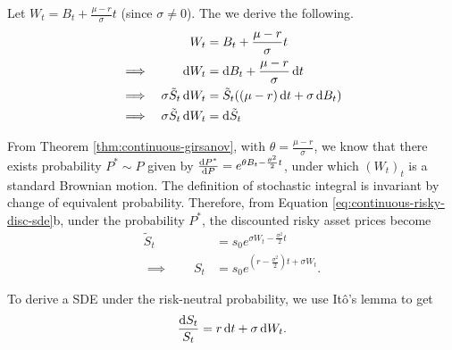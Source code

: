 Let $ W_t = B_t + \frac{\mu - r}{\sigma} t $ (since $ \sigma \ne 0 $). The we derive the following.
\begin{subequations}
	\label{eq:continuous-risky-disc-sde}
	\begin{align}
		&&  W_t  &=  B_t + \frac{\mu - r}{\sigma} t  \\
		\implies  &&  \dif W_t  &=  \dif B_t + \frac{\mu - r}{\sigma} \dif t  \nonumber \\
		\implies  &&  \sigma \tilde{S}_t \dif W_t  &=  \tilde{S}_t ( (\mu - r) \dif t + \sigma \dif B_t )  \nonumber \\
		\implies  &&  \sigma \tilde{S}_t \dif W_t  &=  \dif \tilde{S}_t
	\end{align}
\end{subequations}

From Theorem \ref{thm:continuous-girsanov}, with $ \theta = \frac{\mu - r}{\sigma} $, we know that there exists probability $ P^* \sim P $ given by $ \frac{\dif P^*}{\dif P} = e^{ \theta B_t - \frac{\theta^2}{2} t } $,
under which $ (W_t)_t $ is a standard Brownian motion. The definition of stochastic integral is invariant by change of equivalent probability. Therefore, from Equation \ref{eq:continuous-risky-disc-sde}b, under the probability $ P^* $, the discounted risky asset prices become
\begin{subequations}
	\label{eq:continous-risky}
	\begin{align}
		\tilde{S}_t  &=  s_0 e^{\sigma W_t - \frac{\sigma^2}{2} t }  \\
		\implies  \qquad  S_t  &=  s_0 e^{ ( r - \frac{\sigma^2}{2} ) t + \sigma W_t }.
	\end{align}	
\end{subequations}

To derive a SDE under the risk-neutral probability, we use Itô's lemma to get
\begin{equation}
	\label{eq:continuous-risky-sde-risk-neutral}
	\frac{\dif S_t}{S_t} = r \dif t + \sigma \dif W_t .
\end{equation}


